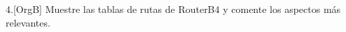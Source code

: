 \begin{ejer}
4.[OrgB] Muestre las tablas de rutas de RouterB4 y comente los aspectos más relevantes.
\end{ejer}